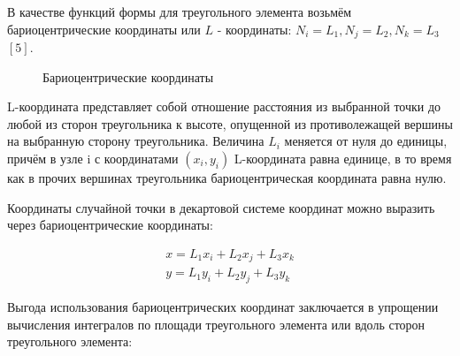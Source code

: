 \documentclass[a4paper]{article}
\begin{document}
В качестве функций формы для треугольного элемента возьмём бариоцентрические координаты или $L$ - координаты: $N_i = L_1, N_j = L_2, N_k = L_3$ $\left[5\right]$. 

\newpage

\begin{figure}[h]
\caption{Бариоцентрические координаты}
\label{fig:bario}
\end{figure}

L-координата представляет собой отношение расстояния из выбранной точки до любой из сторон треугольника к высоте, опущенной из противолежащей вершины на выбранную сторону треугольника. Величина $L_i$ меняется от нуля до единицы, причём в узле i с координатами $(x_i, y_i)$ L-координата равна единице, в то время как в прочих вершинах треугольника бариоцентрическая координата равна нулю.

Координаты случайной точки в декартовой системе координат можно выразить через бариоцентрические координаты:

\begin{eqnarray*}
x = L_1 x_i + L_2 x_j + L_3 x_k \\
y = L_1 y_i + L_2 y_j + L_3 y_k
\end{eqnarray*}

Выгода использования бариоцентрических координат заключается в упрощении вычисления интегралов по площади треугольного элемента или вдоль сторон треугольного элемента:
\end{document}
